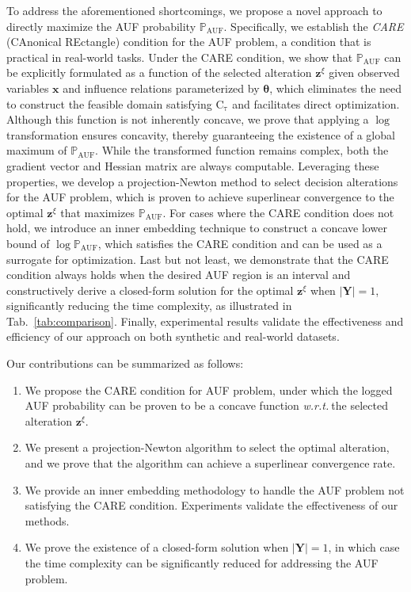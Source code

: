 \documentclass{article}
\theoremstyle{plain}
\theoremstyle{definition}
\def \x {\mathbf{x}}
\def \Y{\mathbf{Y}}
\def \wrt {\textit{w.r.t.}$\ $}
\def \x {\mathbf{x}}
\def \Y {\mathbf{Y}}
\def \z {\mathbf{z}}
\begin{document}
To address the aforementioned shortcomings, we propose a novel approach to directly maximize the AUF probability $\mathbb{P}_{\operatorname*{AUF}}$. 
Specifically, we establish the \emph{CARE} (CAnonical REctangle) condition for the AUF problem, a condition that is practical in real-world tasks. 
Under the CARE condition, we show that $\mathbb{P}_{\operatorname*{AUF}}$ can be explicitly formulated as a function of the selected alteration $\z^\xi$ given observed variables $\x$ and influence relations parameterized by $\bm{\theta}$, which eliminates the need to construct the feasible domain satisfying $\operatorname*{C_\tau}$ and facilitates direct optimization. 
Although this function is not inherently concave, we prove that applying a $\log$ transformation ensures concavity, thereby guaranteeing the existence of a global maximum of $\mathbb{P}_{\operatorname*{AUF}}$.
While the transformed function remains complex, both the gradient vector and Hessian matrix are always computable. 
Leveraging these properties, we develop a projection-Newton method to select decision alterations for the AUF problem, which is proven to achieve superlinear convergence to the optimal $\z^\xi$ that maximizes $\mathbb{P}_{\operatorname*{AUF}}$. 
For cases where the CARE condition does not hold, we introduce an inner embedding technique to construct a concave lower bound of $\log\mathbb{P}_{\operatorname*{AUF}}$, which satisfies the CARE condition and can be used as a surrogate for optimization. 
Last but not least, we demonstrate that the CARE condition always holds when the desired AUF region is an interval and constructively derive a closed-form solution for the optimal $\z^\xi$ when $|\Y| = 1$, significantly reducing the time complexity, as illustrated in Tab.~\ref{tab:comparison}. 
Finally, experimental results validate the effectiveness and efficiency of our approach on both synthetic and real-world datasets. 

Our contributions can be summarized as follows:

\vspace{-0.15in}
\begin{enumerate}[leftmargin=12pt, itemsep=-0.04in]
  \item 
  We propose the CARE condition for AUF problem, under which the logged AUF probability can be proven to be a concave function \wrt the selected alteration $\z^\xi$.
  \item 
  We present a projection-Newton algorithm to select the optimal alteration, and we prove that the algorithm can achieve a superlinear convergence rate.
  \item 
  We provide an inner embedding methodology to handle the AUF problem not satisfying the CARE condition. Experiments validate the effectiveness of our methods.
  \item 
  We prove the existence of a closed-form solution when $|\Y|=1$, in which case the time complexity can be significantly reduced for addressing the AUF problem.
\end{enumerate}
\end{document}
